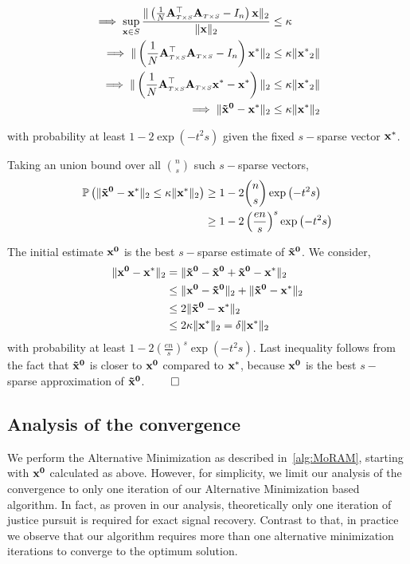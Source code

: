 {\begin{align*}
\implies \sup_{\mathbf{x} \in S} \frac{\|\left(\frac{1}{N} \mathbf{A}_{\scriptscriptstyle{T\times S}}^\top \mathbf{A}_{\scriptscriptstyle{T\times S}} - I_n\right)\mathbf{x}\|_2}{\|\mathbf{x}\|_2} &\leq \kappa \\
\implies \|\left(\frac{1}{N} \mathbf{A}_{\scriptscriptstyle{T\times S}}^\top \mathbf{A}_{\scriptscriptstyle{T\times S}} - I_n\right)\mathbf{x^*}\|_2 &\leq \kappa \|\mathbf{x^*}_2\| \\
\implies \|\left(\frac{1}{N} \mathbf{A}_{\scriptscriptstyle{T\times S}}^\top \mathbf{A}_{\scriptscriptstyle{T\times S}}\mathbf{x^*} - \mathbf{x^*}\right)\|_2 &\leq \kappa \|\mathbf{x^*}_2\| \\
\implies \|\mathbf{\tilde{x}^0} - \mathbf{x^*}\|_2 &\leq \kappa \|\mathbf{x^*}\|_2 \\
\end{align*}

with probability at least $1 - 2\exp\left(-t^2s\right)$ given the fixed $s-$sparse vector $\mathbf{x^*}$.

Taking an union bound over all $n \choose s$ such $s-$sparse vectors,
\begin{align*}
\mathbb{P}\left(\|\mathbf{\tilde{x}^0} - \mathbf{x^*}\|_2 \leq \kappa \|\mathbf{x^*}\|_2\right) & \geq 1 - 2{n \choose s}\exp\left(-t^2s\right) \\ 
& \geq 1 - 2\left(\frac{en}{s}\right)^s\exp\left(-t^2s\right)
\end{align*}

The initial estimate $\mathbf{x^0}$ is the best $s-$sparse estimate of $\mathbf{\tilde{x}^0}$. We consider,
\begin{align*}
\|\mathbf{{x}^0} - \mathbf{x^*}\|_2 &=  \|\mathbf{\tilde{x}^0} -\mathbf{\tilde{x}^0} +\mathbf{\tilde{x}^0} - \mathbf{x^*}\|_2 \\
& \leq \|\mathbf{{x}^0} -\mathbf{\tilde{x}^0}\|_2 +  \|\mathbf{\tilde{x}^0} - \mathbf{x^*}\|_2 \\
& \leq 2 \|\mathbf{\tilde{x}^0} - \mathbf{x^*}\|_2 \\
& \leq 2 \kappa \|\mathbf{x^*}\|_2 = \delta \|\mathbf{x^*}\|_2
\end{align*}
with probability at least $1 - 2\left(\frac{en}{s}\right)^s\exp\left(-t^2s\right)$.
Last inequality follows from the fact that $\mathbf{\tilde{x}^0}$ is closer to $\mathbf{x^0}$ compared to $\mathbf{x^*}$, because $\mathbf{x^0}$ is the best $s-$sparse approximation of $\mathbf{\tilde{x}^0}$. $\qed$}

\subsection{Analysis of the convergence}
We perform the Alternative Minimization as described in~\ref{alg:MoRAM}, starting with $\mathbf{x^0}$ calculated as above. However, for simplicity, we limit our analysis of the convergence to only one iteration of our Alternative Minimization based algorithm. In fact, as proven in our analysis, theoretically only one iteration of justice pursuit is required for exact signal recovery. Contrast to that, in practice we observe that our algorithm requires more than one alternative minimization iterations to converge to the optimum solution.

